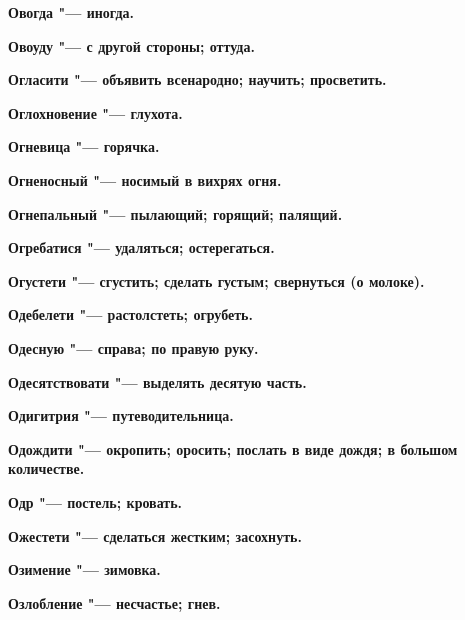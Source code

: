 \begin{multicols}{2}
\bfseries Овогда\normalfont{} "--- иногда. 




\bfseries Овоуду\normalfont{} "--- с другой стороны; оттуда. 




\bfseries Огласити\normalfont{} "--- объявить всенародно; научить; просветить. 




\bfseries Оглохновение\normalfont{} "--- глухота. 




\bfseries Огневица\normalfont{} "--- горячка. 




\bfseries Огненосный\normalfont{} "--- носимый в вихрях огня. 




\bfseries Огнепальный\normalfont{} "--- пылающий; горящий; палящий. 




\bfseries Огребатися\normalfont{} "--- удаляться; остерегаться. 




\bfseries Огустети\normalfont{} "--- сгустить; сделать густым; свернуться (о молоке). 




\bfseries Одебелети\normalfont{} "--- растолстеть; огрубеть. 




\bfseries Одесную\normalfont{} "--- справа; по правую руку. 




\bfseries Одесятствовати\normalfont{} "--- выделять десятую часть. 




\bfseries Одигитрия\normalfont{} "--- путеводительница. 




\bfseries Одождити\normalfont{} "--- окропить; оросить; послать в виде дождя; в большом количестве. 




\bfseries Одр\normalfont{} "--- постель; кровать. 




\bfseries Ожестети\normalfont{} "--- сделаться жестким; засохнуть. 




\bfseries Озимение\normalfont{} "--- зимовка. 




\bfseries Озлобление\normalfont{} "--- несчастье; гнев. 





\end{multicols}
